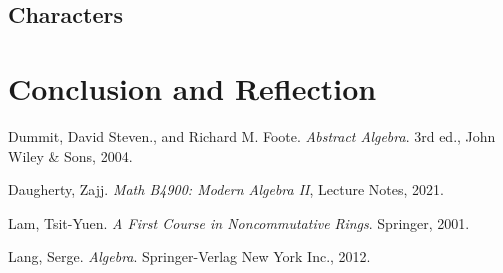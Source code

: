 \documentclass[11pt, reqno]{amsart}
\theoremstyle{plain}
\theoremstyle{definition}
\theoremstyle{example}
\begin{document}
\subsection{Characters}




\section{Conclusion and Reflection}




\newpage
\begin{thebibliography}{9}

Dummit, David Steven., and Richard M. Foote. \textit{Abstract Algebra}. 3rd ed., John Wiley \& Sons, 2004. 

Daugherty, Zajj. \textit{Math B4900: Modern Algebra II}, Lecture Notes, 2021.

Lam, Tsit-Yuen. \textit{A First Course in Noncommutative Rings}. Springer, 2001. 

Lang, Serge. \textit{Algebra}. Springer-Verlag New York Inc., 2012. 

\end{thebibliography}
\end{document}

